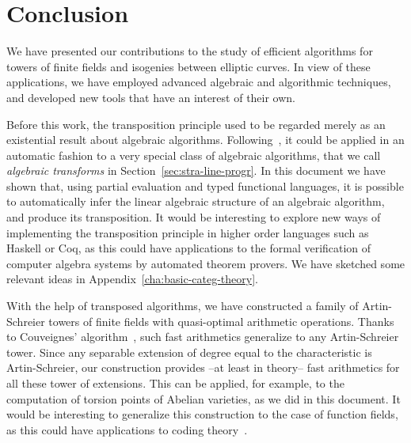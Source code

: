 \chapter{Conclusion}

We have presented our contributions to the study of efficient
algorithms for towers of finite fields and isogenies between elliptic
curves. In view of these applications, we have employed advanced
algebraic and algorithmic techniques, and developed new tools that
have an interest of their own.

Before this work, the transposition principle used to be regarded
merely as an existential result about algebraic algorithms.
Following~\cite{bostan+lecerf+schost:tellegen}, it could be applied in
an automatic fashion to a very special class of algebraic algorithms,
that we call \emph{algebraic transforms} in
Section~\ref{sec:stra-line-progr}. In this document we have shown
that, using partial evaluation and typed functional languages, it is
possible to automatically infer the linear algebraic structure of an
algebraic algorithm, and produce its transposition.  It would be
interesting to explore new ways of implementing the transposition
principle in higher order languages such as Haskell or Coq, as this
could have applications to the formal verification of computer algebra
systems by automated theorem provers.  We have sketched some relevant
ideas in Appendix~\ref{cha:basic-categ-theory}.

With the help of transposed algorithms, we have constructed a family
of Artin-Schreier towers of finite fields with quasi-optimal
arithmetic operations. Thanks to Couveignes'
algorithm~\cite{couveignes00}, such fast arithmetics generalize to any
Artin-Schreier tower. Since any separable extension of degree equal to
the characteristic is Artin-Schreier, our construction provides --at
least in theory-- fast arithmetics for all these tower of extensions.
This can be applied, for example, to the computation of torsion points
of Abelian varieties, as we did in this document. It would be
interesting to generalize this construction to the case of function
fields, as this could have applications to coding
theory~\cite{garcia+stichtenoth96,shum-et-al01}.

